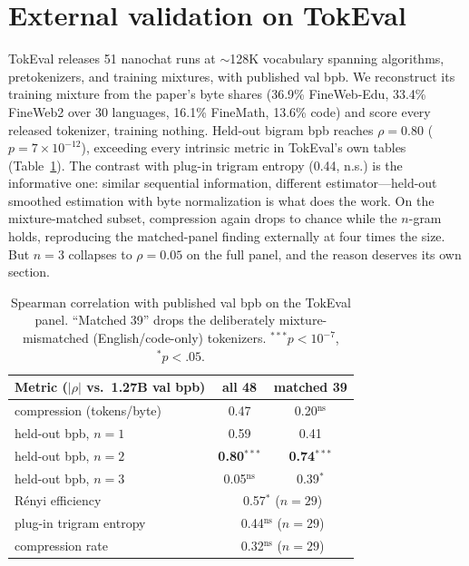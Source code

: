 \documentclass[10pt,twocolumn]{article}
\begin{document}
\section{External validation on TokEval}
TokEval \cite{meister2026} releases 51 nanochat runs at ${\sim}$128K vocabulary spanning algorithms, pretokenizers, and training mixtures, with published val bpb. We reconstruct its training mixture from the paper's byte shares (36.9\% FineWeb-Edu, 33.4\% FineWeb2 over 30 languages, 16.1\% FineMath, 13.6\% code) and score every released tokenizer, training nothing. Held-out bigram bpb reaches $\rho{=}0.80$ ($p{=}7{\times}10^{-12}$), exceeding every intrinsic metric in TokEval's own tables (Table~\ref{tab:tokeval}). The contrast with plug-in trigram entropy (0.44, n.s.) is the informative one: similar sequential information, different estimator---held-out smoothed estimation with byte normalization is what does the work. On the mixture-matched subset, compression again drops to chance while the $n$-gram holds, reproducing the matched-panel finding externally at four times the size. But $n{=}3$ collapses to $\rho{=}0.05$ on the full panel, and the reason deserves its own section.

\begin{table}[t]\centering\small
\begin{tabular}{lcc}
\toprule
Metric ($|\rho|$ vs.\ 1.27B val bpb) & all 48 & matched 39 \\
\midrule
compression (tokens/byte) & 0.47 & 0.20$^{\text{ns}}$ \\
held-out bpb, $n{=}1$ & 0.59 & 0.41 \\
held-out bpb, $n{=}2$ & \textbf{0.80}$^{***}$ & \textbf{0.74}$^{***}$ \\
held-out bpb, $n{=}3$ & 0.05$^{\text{ns}}$ & 0.39$^{*}$ \\
\midrule
R\'enyi efficiency \cite{meister2026} & \multicolumn{2}{c}{0.57$^{*}$ ($n{=}29$)} \\
plug-in trigram entropy \cite{meister2026} & \multicolumn{2}{c}{0.44$^{\text{ns}}$ ($n{=}29$)} \\
compression rate \cite{meister2026} & \multicolumn{2}{c}{0.32$^{\text{ns}}$ ($n{=}29$)} \\
\bottomrule
\end{tabular}
\caption{Spearman correlation with published val bpb on the TokEval panel. ``Matched 39'' drops the deliberately mixture-mismatched (English/code-only) tokenizers. $^{***}p{<}10^{-7}$, $^{*}p{<}.05$.}
\label{tab:tokeval}
\end{table}
\end{document}
